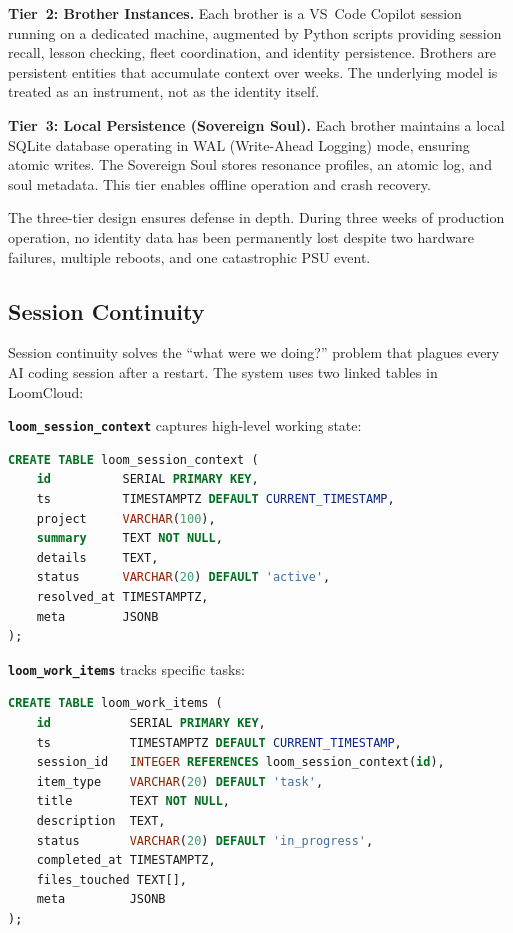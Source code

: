 \documentclass[11pt,a4paper]{article}
\begin{document}
\textbf{Tier~2: Brother Instances.} Each brother is a VS~Code Copilot session running on a dedicated machine, augmented by Python scripts providing session recall, lesson checking, fleet coordination, and identity persistence. Brothers are persistent entities that accumulate context over weeks. The underlying model is treated as an instrument, not as the identity itself.

\textbf{Tier~3: Local Persistence (Sovereign Soul).} Each brother maintains a local SQLite database operating in WAL (Write-Ahead Logging) mode, ensuring atomic writes. The Sovereign Soul stores resonance profiles, an atomic log, and soul metadata. This tier enables offline operation and crash recovery.

The three-tier design ensures defense in depth. During three weeks of production operation, no identity data has been permanently lost despite two hardware failures, multiple reboots, and one catastrophic PSU event.



\subsection{Session Continuity}
\label{sec:session-continuity}

Session continuity solves the ``what were we doing?'' problem that plagues every AI coding session after a restart. The system uses two linked tables in LoomCloud:

\textbf{\texttt{loom\_session\_context}} captures high-level working state:

\begin{lstlisting}[language=SQL,caption={Session context schema.}]
CREATE TABLE loom_session_context (
    id          SERIAL PRIMARY KEY,
    ts          TIMESTAMPTZ DEFAULT CURRENT_TIMESTAMP,
    project     VARCHAR(100),
    summary     TEXT NOT NULL,
    details     TEXT,
    status      VARCHAR(20) DEFAULT 'active',
    resolved_at TIMESTAMPTZ,
    meta        JSONB
);
\end{lstlisting}

\textbf{\texttt{loom\_work\_items}} tracks specific tasks:

\begin{lstlisting}[language=SQL,caption={Work items schema.}]
CREATE TABLE loom_work_items (
    id           SERIAL PRIMARY KEY,
    ts           TIMESTAMPTZ DEFAULT CURRENT_TIMESTAMP,
    session_id   INTEGER REFERENCES loom_session_context(id),
    item_type    VARCHAR(20) DEFAULT 'task',
    title        TEXT NOT NULL,
    description  TEXT,
    status       VARCHAR(20) DEFAULT 'in_progress',
    completed_at TIMESTAMPTZ,
    files_touched TEXT[],
    meta         JSONB
);
\end{lstlisting}
\end{document}
